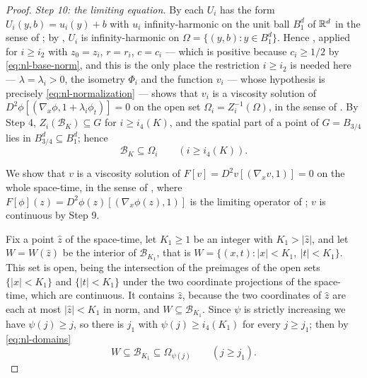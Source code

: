 \begin{proof}
\emph{Step 10: the limiting equation.}
By  each $U_i$ has the form
$U_i(y,b)=u_i(y)+b$ with $u_i$ infinity-harmonic on the unit ball $B_1^d$ of
$\mathbb{R}^d$ in the sense of ; by ,
$U_i$ is infinity-harmonic on $\Omega=\{(y,b):y\in B_1^d\}$. Hence
, applied for $i\ge i_2$ with $z_0=z_i$, $r=r_i$,
$c=c_i$ --- which is positive because $c_i\ge1/2$ by \eqref{eq:nl-base-norm}, and
this is the only place the restriction $i\ge i_2$ is needed here ---
$\lambda=\lambda_i>0$, the isometry $\Phi_i$ and the function $v_i$ --- whose
hypothesis is precisely \eqref{eq:nl-normalization} --- shows that $v_i$ is a
viscosity solution of $D^2\phi[(\nabla_x\phi,1+\lambda_i\phi_t)]=0$ on the open
set $\Omega_i=Z_i^{-1}(\Omega)$, in the sense of
. By Step 4, $Z_i(\mathcal B_K)\subseteq G$ for
$i\ge i_4(K)$, and the spatial part of a point of $G=B_{3/4}$ lies in
$B_{3/4}^d\subseteq B_1^d$; hence
\begin{equation}\label{eq:nl-domains}
  \mathcal B_K\subseteq\Omega_i\qquad(i\ge i_4(K)).
\end{equation}

We show that $v$ is a viscosity solution of $F[v]=D^2v[(\nabla_xv,1)]=0$ on the
whole space-time, in the sense of , where
$F[\phi](z)=D^2\phi(z)[(\nabla_x\phi(z),1)]$ is the limiting operator of
; $v$ is continuous by Step 9.

Fix a point $\hat z$ of the space-time, let $K_1\ge1$ be an integer with
$K_1>|\hat z|$, and let $W=W(\hat z)$ be the interior of $\mathcal B_{K_1}$,
that is $W=\{(x,t):|x|<K_1,\ |t|<K_1\}$. This set is open, being the intersection
of the preimages of the open sets $\{|x|<K_1\}$ and $\{|t|<K_1\}$ under the two
coordinate projections of the space-time, which are continuous. It contains $\hat z$,
because the two coordinates of $\hat z$ are each at most $|\hat z|<K_1$ in norm,
and $W\subseteq\mathcal B_{K_1}$. Since $\psi$ is strictly increasing we have
$\psi(j)\ge j$, so there is $j_1$ with $\psi(j)\ge i_4(K_1)$ for every $j\ge j_1$;
then by \eqref{eq:nl-domains}
\begin{equation}\label{eq:nl-Wdom}
  W\subseteq\mathcal B_{K_1}\subseteq\Omega_{\psi(j)}\qquad(j\ge j_1).
\end{equation}


\end{proof}
